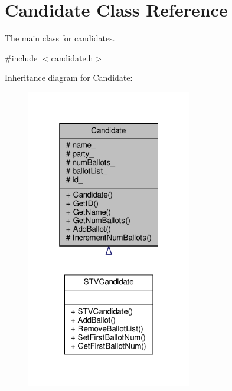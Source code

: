 \hypertarget{classCandidate}{}\section{Candidate Class Reference}
\label{classCandidate}


The main class for candidates.  




{\ttfamily \#include $<$candidate.\+h$>$}



Inheritance diagram for Candidate\+:
\nopagebreak
\begin{figure}[H]
\begin{center}
\leavevmode
\includegraphics[width=205pt]{classCandidate__inherit__graph}
\end{center}
\end{figure}


